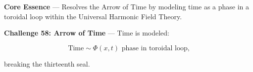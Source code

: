 
\textbf{Core Essence} --- Resolves the Arrow of Time by modeling time as a phase in a toroidal loop within the Universal Harmonic Field Theory.

\textbf{Challenge 58: Arrow of Time} --- Time is modeled:

$$
\text{Time} \sim \Phi(x, t) \text{ phase in toroidal loop,}
$$

breaking the thirteenth seal.

